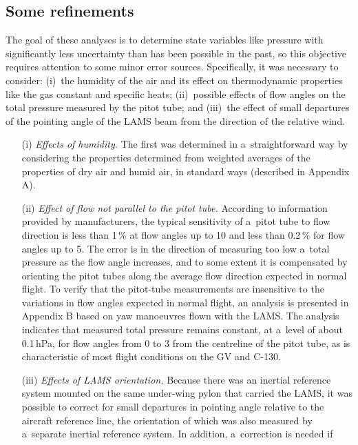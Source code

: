 \documentclass[amtd, online, hvmath]{copernicus}
\begin{document}
\subsection{Some refinements}

The goal of these analyses is to determine state variables like
pressure with significantly less uncertainty than has been possible in
the past, so this objective requires attention to some minor error
sources.  Specifically, it was necessary to consider: (i)~the humidity
of the air and its effect on thermodynamic properties like the gas
constant and specific heats; (ii)~possible effects of flow angles on
the total pressure measured by the pitot tube; and (iii)~the effect of
small departures of the pointing angle of the LAMS beam from the
direction of the relative wind.
\begin{enumerate}
\item[(i)] \textit{Effects of humidity.} The first was determined in
  a~straightforward way by considering the properties determined from
  weighted averages of the properties of dry air and humid air, in
  standard ways (described in Appendix A).
\item[(ii)] \textit{Effect of flow not parallel to the pitot tube.}
  According to information provided by manufacturers, the typical
  sensitivity of a~pitot tube to flow direction is less than 1\,{\%}
  at flow angles up to 10{\degree} and less than 0.2\,{\%} for flow
  angles up to 5{\degree}. The error is in the direction of measuring
  too low a~total pressure as the flow angle increases, and to some
  extent it is compensated by orienting the pitot tubes along the
  average flow direction expected in normal flight. To verify that the
  pitot-tube measurements are insensitive to the variations in flow
  angles expected in normal flight, an analysis is presented in
  Appendix B based on yaw manoeuvres flown with the LAMS. The analysis
  indicates that measured total pressure remains constant, at a~level
  of about 0.1\,hPa, for flow angles from 0 to 3{\degree} from the
  centreline of the pitot tube, as is characteristic of most flight
  conditions on the GV and C-130.
\item[(iii)] \textit{Effects of LAMS orientation.} Because there was
  an inertial reference system mounted on the same under-wing pylon
  that carried the LAMS, it was possible to correct for small
  departures in pointing angle relative to the aircraft reference
  line, the orientation of which was also measured by a~separate
  inertial reference system.  In addition, a~correction is needed if

\end{enumerate}
\end{document}

